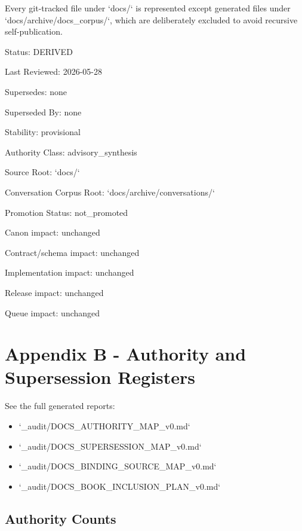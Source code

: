 \documentclass[11pt,a4paper]{report}
\begin{document}
Every git-\allowbreak{}tracked file under `docs/\allowbreak{}` is represented except generated files under `docs/\allowbreak{}archive/\allowbreak{}docs\_corpus/\allowbreak{}`, which are deliberately excluded to avoid recursive self-\allowbreak{}publication.\allowbreak{}



Status: DERIVED

Last Reviewed: 2026-\allowbreak{}05-\allowbreak{}28

Supersedes: none

Superseded By: none

Stability: provisional

Authority Class: advisory\_synthesis

Source Root: `docs/\allowbreak{}`

Conversation Corpus Root: `docs/\allowbreak{}archive/\allowbreak{}conversations/\allowbreak{}`

Promotion Status: not\_promoted

Canon impact: unchanged

Contract/\allowbreak{}schema impact: unchanged

Implementation impact: unchanged

Release impact: unchanged

Queue impact: unchanged


\chapter{Appendix B - Authority and Supersession Registers}

See the full generated reports:


\begin{itemize}
\item `\_audit/\allowbreak{}DOCS\_AUTHORITY\_MAP\_v0.\allowbreak{}md`
\item `\_audit/\allowbreak{}DOCS\_SUPERSESSION\_MAP\_v0.\allowbreak{}md`
\item `\_audit/\allowbreak{}DOCS\_BINDING\_SOURCE\_MAP\_v0.\allowbreak{}md`
\item `\_audit/\allowbreak{}DOCS\_BOOK\_INCLUSION\_PLAN\_v0.\allowbreak{}md`
\end{itemize}

\section{Authority Counts}
\end{document}

